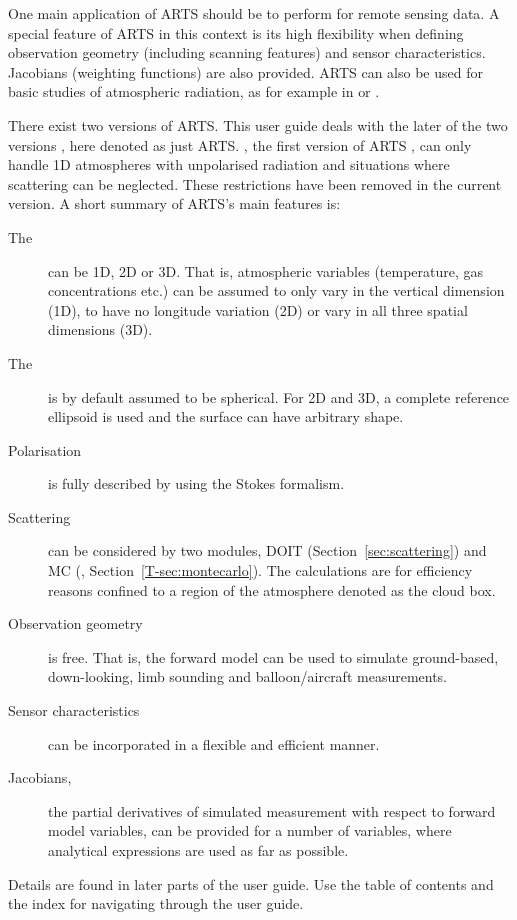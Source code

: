 One main application of ARTS should be to perform
 for remote sensing data. A special feature of
ARTS in this context is its high flexibility when defining observation
geometry (including scanning features) and sensor
characteristics. Jacobians (weighting functions) are also
provided. ARTS can also be used for basic studies of atmospheric
radiation, as for example in \citet{buehler:recen:06} or
\citet{john:under:06}.

There exist two versions of ARTS. This user guide deals with the later
of the two versions \citep{eriksson:arts2:11}, here denoted as just
ARTS. , the first version of ARTS
\citep{buehler:artst:05}, can only handle 1D atmospheres with
unpolarised radiation and situations where scattering can be
neglected.  These restrictions have been removed in the current
version. A short summary of ARTS's main features is:
\begin{description}
\item[The ] can be 1D, 2D or 3D. That is, atmospheric
  variables (temperature, gas concentrations etc.) can be assumed to
  only vary in the vertical dimension (1D), to have no longitude
  variation (2D) or vary in all three spatial dimensions (3D).
\item[The ] is by default assumed to be spherical. For 2D
  and 3D, a complete reference ellipsoid is used and the surface can have
  arbitrary shape.
\item[Polarisation] is fully described by using the Stokes formalism.
\item[Scattering] can be considered by two modules, DOIT
  (Section~\ref{sec:scattering}) and MC (\theory,
  Section~\ref{T-sec:montecarlo}). The  calculations are
  for efficiency reasons confined to a region of the atmosphere denoted as the
  cloud box.
\item[Observation geometry] is free. That is, the forward model can be
  used to simulate ground-based, down-looking, limb sounding and
  balloon/aircraft measurements.
\item[Sensor characteristics] can be incorporated in a flexible and
  efficient manner.
\item[Jacobians,] the partial derivatives of simulated measurement
  with respect to forward model variables, can be provided for a
  number of variables, where analytical expressions are used as far as
  possible.
\end{description}
Details are found in later parts of the user guide. Use the table of
contents and the index for navigating through the user guide.



